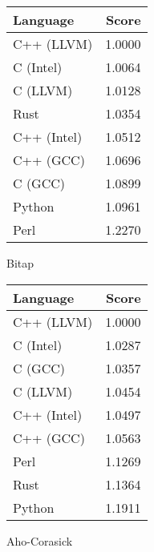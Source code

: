 \begin{subtable}{0.33\textwidth}
    \centering
    \begin{tabular}{|l|r|}
        \hline
        Language & Score \\
        \hline
        C++ (LLVM) & 1.0000 \\
        C (Intel) & 1.0064 \\
        C (LLVM) & 1.0128 \\
        Rust & 1.0354 \\
        C++ (Intel) & 1.0512 \\
        C++ (GCC) & 1.0696 \\
        C (GCC) & 1.0899 \\
        Python & 1.0961 \\
        Perl & 1.2270 \\
        \hline
    \end{tabular}
    \caption{Bitap}
    \label{table:energy:shift_or}
\end{subtable}
\begin{subtable}{0.33\textwidth}
    \centering
    \begin{tabular}{|l|r|}
        \hline
        Language & Score \\
        \hline
        C++ (LLVM) & 1.0000 \\
        C (Intel) & 1.0287 \\
        C (GCC) & 1.0357 \\
        C (LLVM) & 1.0454 \\
        C++ (Intel) & 1.0497 \\
        C++ (GCC) & 1.0563 \\
        Perl & 1.1269 \\
        Rust & 1.1364 \\
        Python & 1.1911 \\
        \hline
    \end{tabular}
    \caption{Aho-Corasick}
    \label{table:energy:aho_corasick}
\end{subtable}%
